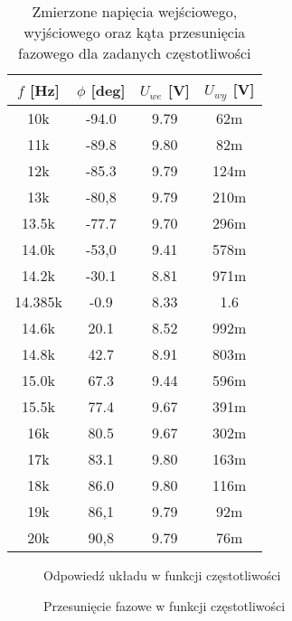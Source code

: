 \begin{table}[H]
	\centering
	\begin{tabular}{c|c|c|c}
		\hline
		\(f\) [Hz] & \(\phi\) [deg] & \(U_{we}\) [V] & \(U_{wy}\) [V]
		\\ \hline\hline
		10k		& -94.0		& 9.79	& 62m	\\ \hline
		11k		& -89.8		& 9.80	& 82m	\\ \hline
		12k		& -85.3		& 9.79	& 124m	\\ \hline
		13k		& -80,8		& 9.79	& 210m	\\ \hline

		13.5k	& -77.7		& 9.70	& 296m	\\ \hline
		14.0k	& -53,0		& 9.41	& 578m	\\ \hline
		14.2k	& -30.1		& 8.81	& 971m	\\ \hline
		14.385k	& -0.9		& 8.33	& 1.6	\\ \hline
		14.6k	& 20.1		& 8.52	& 992m	\\ \hline
		14.8k	& 42.7		& 8.91	& 803m	\\ \hline
		15.0k	& 67.3		& 9.44	& 596m	\\ \hline
		15.5k	& 77.4		& 9.67	& 391m	\\ \hline

		16k		& 80.5		& 9.67	& 302m	\\ \hline
		17k		& 83.1		& 9.80	& 163m	\\ \hline
		18k		& 86.0		& 9.80	& 116m	\\ \hline
		19k		& 86,1		& 9.79	& 92m	\\ \hline
		20k		& 90,8		& 9.79	& 76m	\\ \hline

	\end{tabular}
	\caption{Zmierzone napięcia wejściowego, wyjściowego oraz kąta przesunięcia fazowego dla zadanych częstotliwości}
\end{table}

\begin{figure}[H]
	\centering
	
	\caption{Odpowiedź układu w funkcji częstotliwości}
\end{figure}

\begin{figure}[H]
	\centering
	
	\caption{Przesunięcie fazowe w funkcji częstotliwości}
\end{figure}
